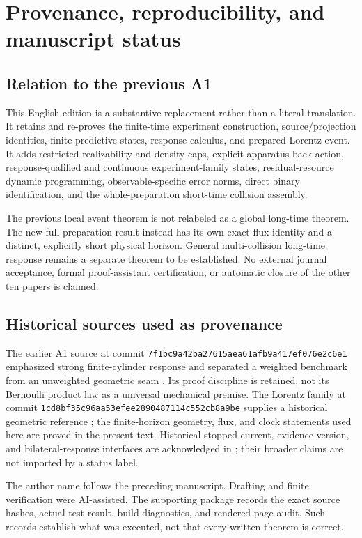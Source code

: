 \section{Provenance, reproducibility, and manuscript status}\label{app:verification}
\subsection{Relation to the previous A1}
This English edition is a substantive replacement rather than a literal translation. It retains and re-proves the finite-time experiment construction, source/projection identities, finite predictive states, response calculus, and prepared Lorentz event. It adds restricted realizability and density caps, explicit apparatus back-action, response-qualified and continuous experiment-family states, residual-resource dynamic programming, observable-specific error norms, direct binary identification, and the whole-preparation short-time collision assembly.

The previous local event theorem is not relabeled as a global long-time theorem. The new full-preparation result instead has its own exact flux identity and a distinct, explicitly short physical horizon. General multi-collision long-time response remains a separate theorem to be established. No external journal acceptance, formal proof-assistant certification, or automatic closure of the other ten papers is claimed.

\subsection{Historical sources used as provenance}
The earlier A1 source at commit \texttt{7f1bc9a42ba27615aea61afb9a417ef076e2c6e1} emphasized strong finite-cylinder response and separated a weighted benchmark from an unweighted geometric seam \cite{RepoA1}. Its proof discipline is retained, not its Bernoulli product law as a universal mechanical premise. The Lorentz family at commit \texttt{1cd8bf35c96aa53efee2890487114c552cb8a9be} supplies a historical geometric reference \cite{RepoLorentz}; the finite-horizon geometry, flux, and clock statements used here are proved in the present text. Historical stopped-current, evidence-version, and bilateral-response interfaces are acknowledged in \cite{RepoA3,RepoC2,RepoCM2}; their broader claims are not imported by a status label.

The author name follows the preceding manuscript. Drafting and finite verification were AI-assisted. The supporting package records the exact source hashes, actual test result, build diagnostics, and rendered-page audit. Such records establish what was executed, not that every written theorem is correct.

